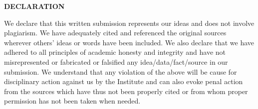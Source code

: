 
\certificate

\makeapproval




\begin{declaration}
\begin{center}
\Large \bf {DECLARATION}
\end{center}

\noindent
We declare that this written submission represents our ideas and does not involve plagiarism.  We have
adequately cited and referenced the original sources wherever others' ideas or words have been included. We also declare
that we have adhered to all principles of academic honesty and
integrity and have not misrepresented or fabricated or falsified any
idea/data/fact/source in our submission. We understand that any
violation of the above will be cause for disciplinary action against us by the
Institute and can also evoke penal action from the sources which
have thus not been properly cited or from whom proper permission has
not been taken when needed.

\end{declaration}








